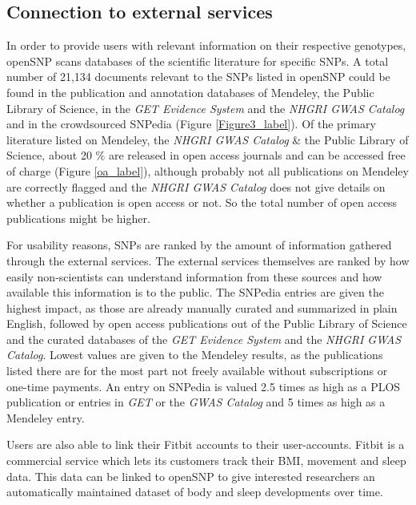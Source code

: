 \documentclass[10pt]{article}
\begin{document}
\subsection*{Connection to external services}
In order to provide users with relevant information on their respective genotypes, openSNP scans databases of the scientific literature for specific SNPs. 
A total number of 21,134 documents relevant to the SNPs listed in openSNP could be found in the publication and annotation databases of Mendeley, the Public Library of Science, in the \emph{GET Evidence System} \cite{Ball24072012} and the \emph{NHGRI GWAS Catalog} \cite{Hindorff2009} and in the crowdsourced SNPedia (Figure \ref{Figure3_label}).
Of the primary literature listed on Mendeley, the \emph{NHGRI GWAS Catalog} \& the Public Library of Science, about 20 \% are released in open access journals and can be accessed free of charge (Figure \ref{oa_label}), although probably not all publications on Mendeley are correctly flagged and the \emph{NHGRI GWAS Catalog} does not give details on whether a publication is open access or not. So the total number of open access publications might be higher. 

For usability reasons, 
SNPs are ranked by the amount of information gathered through the external services. The external services themselves are ranked by how easily non-scientists can understand information 
from these sources and how available this information is to the public. The SNPedia entries are given the highest impact, as those are already manually curated and summarized in plain English, followed by open access publications out of 
the Public Library of Science and the curated databases of the \emph{GET Evidence System} and the \emph{NHGRI GWAS Catalog}. Lowest values are given to the Mendeley results, as the publications listed there are for the most part not freely available without subscriptions or one-time payments. 
An entry on SNPedia is valued 2.5 times as high as a PLOS publication or entries in \emph{GET} or the \emph{GWAS Catalog} and 5 times as high as a Mendeley entry. 

Users are also able to link their Fitbit\cite{fitbit} accounts to their user-accounts. Fitbit is a commercial service which lets its customers track their BMI, movement and sleep data. This data can be linked to openSNP to give interested researchers an automatically maintained dataset of body and sleep developments over time.
\end{document}
